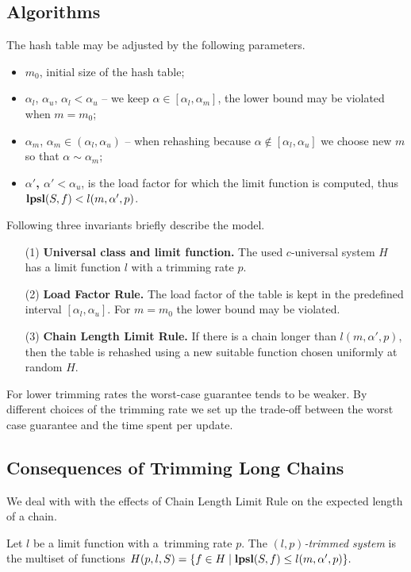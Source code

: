 \subsection{Algorithms}
The hash table may be adjusted by the following parameters.
\begin{itemize}
	\item {$m_0$}, initial size of the hash table;
	\item {$\alpha_l$, $\alpha_u$, $\alpha_l < \alpha_u$} -- we keep $\alpha \in [\alpha_l, \alpha_m]$, the lower bound may be violated when $m = m_0$;
	\item {$\alpha_m$, $\alpha_m \in (\alpha_l, \alpha_u)$} -- when rehashing because $\alpha \notin [\alpha_l, \alpha_u]$ we choose new $m$ so that $\alpha \sim \alpha_m$;
	\item \textbf{$\alpha'$, $\alpha' < \alpha_u$}, is the load factor for which the limit function is computed, thus $\mathbf{lpsl}(S, f) < l(m, \alpha', p)$.
\end{itemize}
Following three invariants briefly describe the model. 
\begin{itemize}
\item[(1)] \textbf{Universal class and limit function.} The used $c$-universal system $H$ has a limit function $l$ with a trimming rate $p$.
\item[(2)] \textbf{Load Factor Rule.} The load factor of the table is kept in the predefined interval $[\alpha_l, \alpha_u]$. For $m = m_0$ the lower bound may be violated.
\item[(3)] \textbf{Chain Length Limit Rule.} If there is a chain longer than $l(m, \alpha', p)$, then the table is rehashed using a new suitable function chosen uniformly at random $H$.
\end{itemize}

For lower trimming rates the worst-case guarantee tends to be weaker.
By different choices of the trimming rate we set up the trade-off between the worst case guarantee and the time spent per update.



\subsection{Consequences of Trimming Long Chains}
We deal with with the effects of Chain Length Limit Rule on the expected length of a chain.

\begin{definition}
\label{definition-trimmed-system}
Let $l$ be a limit function with a~trimming rate $p$.
The \emph{$(l, p)$-trimmed system} is the multiset of functions $H(p, l, S) = \{ f \in H \mid \mathbf{lpsl}(S, f) \leq l(m, \alpha', p) \}.$
\end{definition}

